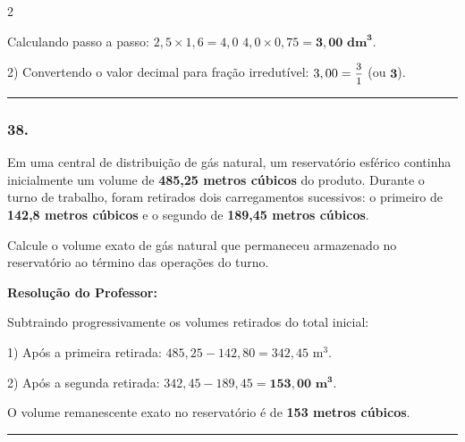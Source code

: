 \begin{multicols*}{2}
\begin{tcolorbox}[colback=CorTitUm!5, colframe=CorTitUm, boxrule=1pt, arc=4pt, left=6pt, right=6pt, top=6pt, bottom=6pt]
    Calculando passo a passo:
    $2,5 \times 1,6 = 4,0$
    $4,0 \times 0,75 = \mathbf{3,00\text{ dm}^3}$.
    
    2) Convertendo o valor decimal para fração irredutível:
    $3,00 = \mfrac{3}{1}$ (ou $\mathbf{3}$).
    \end{tcolorbox}
\fi

\par\vspace{\espacoQuestao}

\noindent\textcolor{CorLinha}{\rule{\linewidth}{0.5pt}} 
\par\vspace{\espacoPreQuestao}
\subsubsection*{38.} Em uma central de distribuição de gás natural, um reservatório esférico continha inicialmente um volume de \textbf{485,25 metros cúbicos} do produto. Durante o turno de trabalho, foram retirados dois carregamentos sucessivos: o primeiro de \textbf{142,8 metros cúbicos} e o segundo de \textbf{189,45 metros cúbicos}.

Calcule o volume exato de gás natural que permaneceu armazenado no reservatório ao término das operações do turno.

\ifgabarito
    \begin{tcolorbox}[colback=CorTitUm!5, colframe=CorTitUm, boxrule=1pt, arc=4pt, left=6pt, right=6pt, top=6pt, bottom=6pt]
    \small\textbf{\textcolor{CorTitUm}{Resolução do Professor:}}\par\vspace{0.1cm}
    \color{CinzaEscuro}
    Subtraindo progressivamente os volumes retirados do total inicial:
    
    1) Após a primeira retirada:
    $485,25 - 142,80 = 342,45\text{ m}^3$.
    
    2) Após a segunda retirada:
    $342,45 - 189,45 = \mathbf{153,00\text{ m}^3}$.
    
    O volume remanescente exato no reservatório é de \textbf{153 metros cúbicos}.
    \end{tcolorbox}
\fi

\par\vspace{\espacoQuestao}

\noindent\textcolor{CorLinha}{\rule{\linewidth}{0.5pt}} 
\par\vspace{\espacoPreQuestao}

\end{multicols*}
